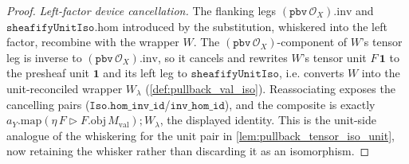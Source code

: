 \begin{proof}
  \emph{Left-factor device cancellation.} The flanking legs
  \((\mathtt{pbv}\,\mathcal{O}_X).\mathrm{inv}\) and \(\mathtt{sheafifyUnitIso}.\mathrm{hom}\)
  introduced by the substitution, whiskered into the left factor, recombine with the wrapper \(W\). The
  \((\mathtt{pbv}\,\mathcal{O}_X)\)-component of \(W\)'s tensor leg is inverse to
  \((\mathtt{pbv}\,\mathcal{O}_X).\mathrm{inv}\), so it cancels and rewrites \(W\)'s tensor unit
  \(F\,\mathbf 1\) to the presheaf unit \(\mathbf 1\) and its left leg to \(\mathtt{sheafifyUnitIso}\),
  i.e. converts \(W\) into the unit-reconciled wrapper \(W_{\lambda}\) (\cref{def:pullback_val_iso}).
  Reassociating exposes the cancelling pairs (\(\mathtt{Iso.hom\_inv\_id}\)/\(\mathtt{inv\_hom\_id}\)),
  and the composite is exactly \(a_Y.\mathrm{map}(\eta\,F \rhd F.\mathrm{obj}\,M_{\mathrm{val}})
  \mathbin{;} W_{\lambda}\), the displayed identity. This is the unit-side analogue of the whiskering
  for the unit pair in \cref{lem:pullback_tensor_iso_unit}, now retaining the whisker rather than
  discarding it as an isomorphism.
\end{proof}

